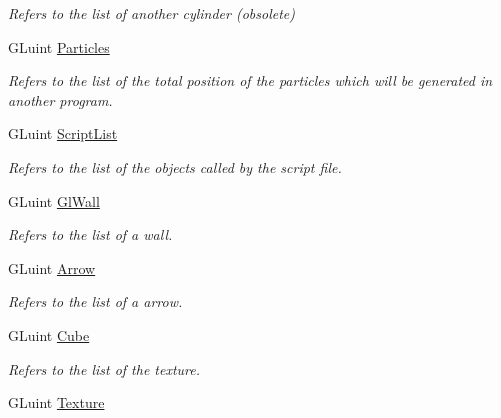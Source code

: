 \begin{DoxyCompactItemize}
\begin{DoxyCompactList}\small\item\em Refers to the list of another cylinder (obsolete) \end{DoxyCompactList}\item 
G\+Luint \hyperlink{classDraw_a0fd83139e0b18df8d7beb2a83c5ab4d2}{Particles}\hypertarget{classDraw_a0fd83139e0b18df8d7beb2a83c5ab4d2}{}\label{classDraw_a0fd83139e0b18df8d7beb2a83c5ab4d2}

\begin{DoxyCompactList}\small\item\em Refers to the list of the total position of the particles which will be generated in another program. \end{DoxyCompactList}\item 
G\+Luint \hyperlink{classDraw_ac78264a39dc846d3770b82d3dbb5fcab}{Script\+List}\hypertarget{classDraw_ac78264a39dc846d3770b82d3dbb5fcab}{}\label{classDraw_ac78264a39dc846d3770b82d3dbb5fcab}

\begin{DoxyCompactList}\small\item\em Refers to the list of the objects called by the script file. \end{DoxyCompactList}\item 
G\+Luint \hyperlink{classDraw_ab6e9ec77599bfe76cdbe67e70d1b2ce8}{Gl\+Wall}\hypertarget{classDraw_ab6e9ec77599bfe76cdbe67e70d1b2ce8}{}\label{classDraw_ab6e9ec77599bfe76cdbe67e70d1b2ce8}

\begin{DoxyCompactList}\small\item\em Refers to the list of a wall. \end{DoxyCompactList}\item 
G\+Luint \hyperlink{classDraw_ae374e4cd54f633606db3098af179b138}{Arrow}\hypertarget{classDraw_ae374e4cd54f633606db3098af179b138}{}\label{classDraw_ae374e4cd54f633606db3098af179b138}

\begin{DoxyCompactList}\small\item\em Refers to the list of a arrow. \end{DoxyCompactList}\item 
G\+Luint \hyperlink{classDraw_a79fa212e7dfcc2876d337a3635ecdc6f}{Cube}\hypertarget{classDraw_a79fa212e7dfcc2876d337a3635ecdc6f}{}\label{classDraw_a79fa212e7dfcc2876d337a3635ecdc6f}

\begin{DoxyCompactList}\small\item\em Refers to the list of the texture. \end{DoxyCompactList}\item 
G\+Luint \hyperlink{classDraw_a29bc3cc5d24dd4366272171786690ab7}{Texture}\hypertarget{classDraw_a29bc3cc5d24dd4366272171786690ab7}{}\label{classDraw_a29bc3cc5d24dd4366272171786690ab7}


\end{DoxyCompactItemize}
